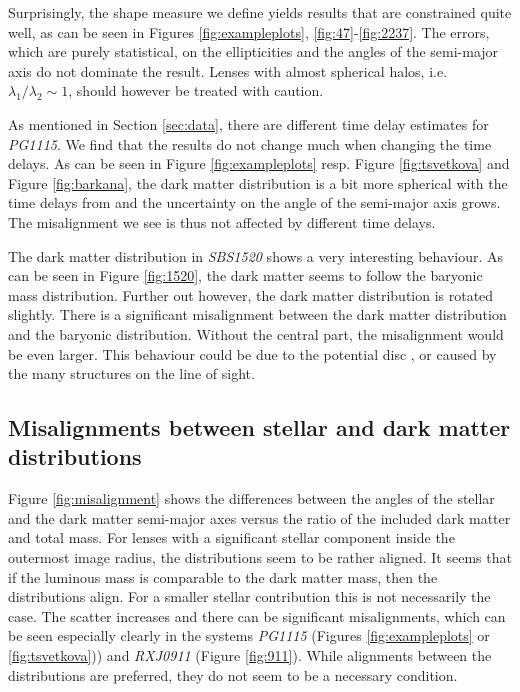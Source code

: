 \documentclass[useAMS,usenatbib]{mn2e}
\begin{document}
Surprisingly, the shape measure we define yields results that are constrained quite well, as can be seen in Figures \ref{fig:exampleplots}, \ref{fig:47}-\ref{fig:2237}. The errors, which are purely statistical, on the ellipticities and the angles of the semi-major axis do not dominate the result. Lenses with almost spherical halos, i.e. $\lambda_{1}/\lambda_{2}\sim1$, should however be treated with caution.

As mentioned in Section \ref{sec:data}, there are different time delay estimates for \textit{PG1115}. We find that the results do not change much when changing the time delays. As can be seen in Figure \ref{fig:exampleplots} resp. Figure \ref{fig:tsvetkova} and Figure \ref{fig:barkana}, the dark matter distribution is a bit more spherical with the time delays from \cite{2010MNRAS.406.2764T} and the uncertainty on the angle of the semi-major axis grows. The misalignment we see is thus not affected by different time delays.

The dark matter distribution in \textit{SBS1520} shows a very interesting behaviour. As can be seen in Figure \ref{fig:1520}, the dark matter seems to follow the baryonic mass distribution. Further out however, the dark matter distribution is rotated slightly. There is a significant misalignment between the dark matter distribution and the baryonic distribution. Without the central part, the misalignment would be even larger. This behaviour could be due to the potential disc \cite{2008ApJ...673..778A}, or caused by the many structures on the line of sight.


\subsection{Misalignments between stellar and dark matter distributions}
Figure \ref{fig:misalignment} shows the differences between the angles of the stellar and the dark matter semi-major axes versus the ratio of the included dark matter and total mass. For lenses with a significant stellar component inside the outermost image radius, the distributions seem to be rather aligned. It seems that if the luminous mass is comparable to the dark matter mass, then the distributions align. For a smaller stellar contribution this is not necessarily the case. The scatter increases and there can be significant misalignments, which can be seen especially clearly in the systems \textit{PG1115} (Figures \ref{fig:exampleplots} or \ref{fig:tsvetkova})) and \textit{RXJ0911} (Figure \ref{fig:911}). While alignments between the distributions are preferred, they do not seem to be a necessary condition.
\end{document}
